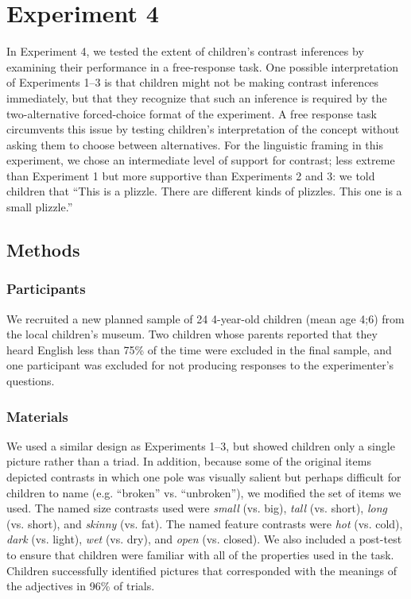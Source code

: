 \documentclass[man]{apa2}
\begin{document}
\section{Experiment 4} 

In Experiment 4, we tested the extent of children's contrast inferences by examining their performance in a free-response task. One possible interpretation of Experiments 1--3 is that children might not be making  contrast inferences immediately, but that they recognize that such an inference is required by the two-alternative forced-choice format of the experiment. A free response task circumvents this issue by testing children's interpretation of the concept without asking them to choose between alternatives. For the linguistic framing in this experiment, we chose an intermediate level of support for contrast; less extreme than Experiment 1 but more supportive than Experiments 2 and 3: we told children that ``This is a plizzle. There are different kinds of plizzles. This one is a small plizzle.'' 

\subsection{Methods}

\subsubsection{Participants}

We recruited a new planned sample of 24 4-year-old children (mean age 4;6) from the local children's museum.  Two children whose parents reported that they heard English less than 75\% of the time were excluded in the final sample, and one participant was excluded for not producing responses to the experimenter's questions.

\subsubsection{Materials}

We used a similar design as Experiments 1--3, but showed children only a single picture rather than a triad.  In addition, because some of the original items depicted contrasts in which one pole was visually salient but perhaps difficult for children to name (e.g. ``broken'' vs. ``unbroken''), we modified the set of items we used.  The named size contrasts used were \emph{small} (vs. big), \emph{tall} (vs. short), \emph{long} (vs. short), and \emph{skinny} (vs. fat).  The named feature contrasts were \emph{hot} (vs. cold), \emph{dark} (vs. light), \emph{wet} (vs. dry), and \emph{open} (vs. closed).  We also included a post-test to ensure that children were familiar with all of the properties used in the task.  Children successfully identified pictures that corresponded with the meanings of the adjectives in 96\% of trials.
\end{document}
